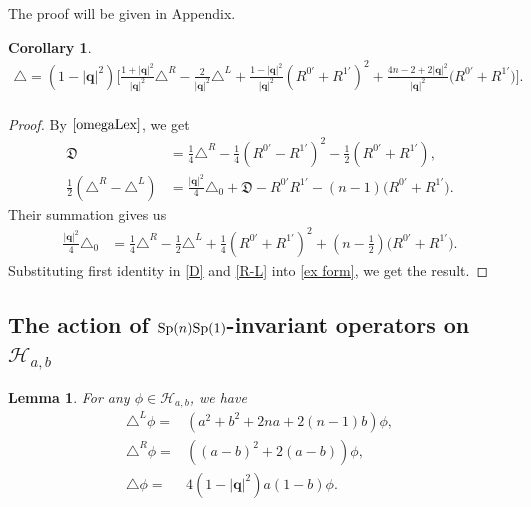 \documentclass[a4paper,11pt]{amsart}
\numberwithin{equation}{section}
\newtheorem{lem}{Lemma}[section]
\newtheorem{cor}{Corollary}[section]
\begin{document}
The proof will be given in Appendix.










\begin{cor}\label{cor ra tan}
\begin{equation*}\begin{aligned}\label{ra ta form}
\triangle= (1-|\mathbf{q}|^2)\bigg[\frac{1+|\mathbf{q}|^2}{|\mathbf{q}|^2}\triangle^R-\frac{2}{|\mathbf{q}|^2}\triangle^L+\frac{1-|\mathbf{q}|^2}{|\mathbf{q}|^2}(R^{0'}+R^{1'})^2 +\frac{4n-2+2|\mathbf{q}|^2}{|\mathbf{q}|^2}(R^{0'}+R^{1'}\bigr)\bigg].\\
\end{aligned}\end{equation*}
\end{cor}
\begin{proof}

By $ \eqref{omegaLex}$, we get
\begin{equation}\begin{aligned}\label{D}
\mathfrak{D}&=\frac{1}{4}\triangle^R-\frac{1}{4}(R^{0'}-R^{1'})^2-\frac{1}{2}(R^{0'}+R^{1'}),\\
\frac12\left(\triangle^R-\triangle^L\right) &= \frac{|\mathbf{q}|^2}{4}\triangle_0+\mathfrak{D}-R^{0'}R^{1'}-(n-1)\bigl(R^{0'}+R^{1'}\bigr).
\end{aligned}\end{equation}
Their summation gives us
\begin{equation}\begin{aligned}\label{R-L}
\frac{|\mathbf{q}|^2}{4}\triangle_0&=\frac14\triangle^R-\frac12\triangle^L+\frac14 ( R^{0'}+R^{1'})^2+\left(n-\frac12\right)\bigl(R^{0'}+R^{1'}\bigr).
\end{aligned}\end{equation}
Substituting first identity in \eqref{D} and \eqref{R-L} into \eqref{ex form}, we get the result.
\end{proof}






\subsection{The action of ${\rm Sp}(n){\rm Sp}(1)$-invariant operators on $\mathcal{H}_{a,b}$}
\begin{lem}\label{lem eigen}
For any $\phi\in \mathcal{H}_{a,b}$, we have
\begin{equation}\begin{aligned}\label{en pab}
\triangle^L\phi=&\left(a^2+b^2+2na+2(n-1)b\right)\phi,\\
\triangle^R\phi=&\left((a-b)^2+2(a-b)\right)\phi,\\
\triangle \phi=&4(1-|\mathbf{q}|^2)a( 1-b)\phi.
\end{aligned}\end{equation}
\end{lem}
\end{document}
